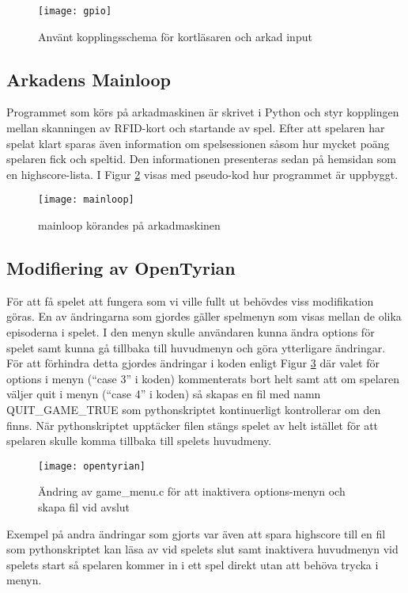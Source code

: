 \documentclass[12pt,fleqn,openany]{book} %
\begin{document}
\begin{figure}[h]
\centering\texttt{[image: gpio]}
\caption{Använt kopplingsschema för kortläsaren och arkad input}
\label{fig_gpio}
\end{figure}

\subsection{Arkadens Mainloop}
Programmet som körs på arkadmaskinen är skrivet i Python och styr kopplingen mellan skanningen av RFID-kort och startande av spel. 
Efter att spelaren har spelat klart sparas även information om spelsessionen såsom hur mycket poäng spelaren fick och speltid. 
Den informationen presenteras sedan på hemsidan som en highscore-lista. I Figur \ref{fig_mainloop} visas med pseudo-kod hur programmet är uppbyggt. 

\begin{figure}[!h]
\texttt{[image: mainloop]}
\label{fig_mainloop}
\caption{mainloop körandes på arkadmaskinen}
\end{figure}

\subsection{Modifiering av OpenTyrian}
För att få spelet att fungera som vi ville fullt ut behövdes viss modifikation göras. En av ändringarna som gjordes 
gäller spelmenyn som visas mellan de olika episoderna i spelet. I den menyn skulle användaren kunna ändra options för 
spelet samt kunna gå tillbaka till huvudmenyn och göra ytterligare ändringar. 
För att förhindra detta gjordes ändringar i koden enligt Figur \ref{fig_opentyrian} där valet för options i menyn 
(“case 3” i koden) kommenterats bort helt samt att om spelaren väljer quit i menyn (“case 4” i koden) så skapas en 
fil med namn QUIT\_GAME\_TRUE som pythonskriptet kontinuerligt kontrollerar om den finns. När pythonskriptet upptäcker 
filen stängs spelet av helt istället för att spelaren skulle komma tillbaka till spelets huvudmeny.

\begin{figure}[!h]
\texttt{[image: opentyrian]}
\caption{Ändring av game\_menu.c för att inaktivera options-menyn och skapa fil vid avslut}
\label{fig_opentyrian}
\end{figure}
Exempel på andra ändringar som gjorts var även att spara highscore till en fil som pythonskriptet kan läsa av vid 
spelets slut samt inaktivera huvudmenyn vid spelets start så spelaren kommer in i ett spel direkt utan att behöva 
trycka i menyn.
\end{document}
